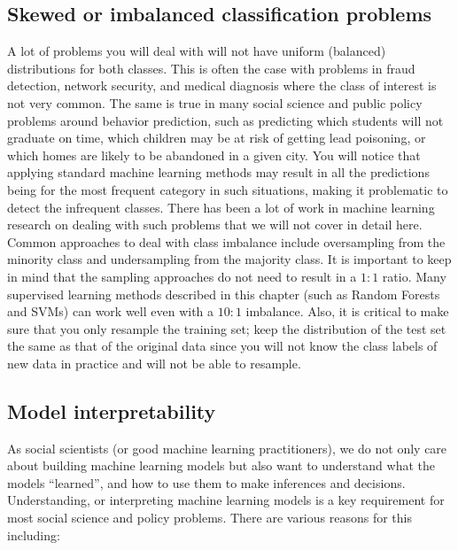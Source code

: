 \documentclass[]{krantz}
\begin{document}
\subsection{Skewed or imbalanced classification
problems}\label{skewed-or-imbalanced-classification-problems}

A lot of problems you will deal with will not have uniform (balanced)
distributions for both classes. This is often the case with problems in
fraud detection, network security, and medical diagnosis where the class
of interest is not very common. The same is true in many social science
and public policy problems around behavior prediction, such as
predicting which students will not graduate on time, which children may
be at risk of getting lead poisoning, or which homes are likely to be
abandoned in a given city. You will notice that applying standard
machine learning methods may result in all the predictions being for the
most frequent category in such situations, making it problematic to
detect the infrequent classes. There has been a lot of work in machine
learning research on dealing with such problems
\citep{Chawla05, KuhnJohnson2013} that we will not cover in detail here.
Common approaches to deal with class imbalance include oversampling from
the minority class and undersampling from the majority class. It is
important to keep in mind that the sampling approaches do not need to
result in a \(1:1\) ratio. Many supervised learning methods described in
this chapter (such as Random Forests and SVMs) can work well even with a
\(10:1\) imbalance. Also, it is critical to make sure that you only
resample the training set; keep the distribution of the test set the
same as that of the original data since you will not know the class
labels of new data in practice and will not be able to resample.

\subsection{Model interpretability}\label{model-interpretability}

As social scientists (or good machine learning practitioners), we do not
only care about building machine learning models but also want to
understand what the models ``learned'', and how to use them to make
inferences and decisions. Understanding, or interpreting machine
learning models is a key requirement for most social science and policy
problems. There are various reasons for this including:
\end{document}
